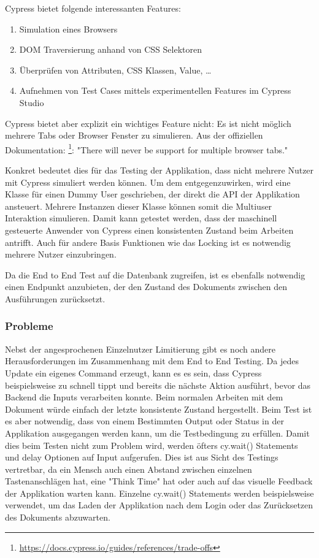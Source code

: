 Cypress bietet folgende interessanten Features:

\begin{enumerate}
    \item Simulation eines Browsers
    \item DOM Traversierung anhand von CSS Selektoren
    \item \"Uberpr\"ufen von Attributen, CSS Klassen, Value, \ldots
    \item Aufnehmen von Test Cases mittels experimentellen Features im Cypress Studio
\end{enumerate}

Cypress bietet aber explizit ein wichtiges Feature nicht: Es ist nicht m\"oglich mehrere Tabs oder Browser Fenster zu simulieren.
Aus der offiziellen Dokumentation: \footnote{\href{https://docs.cypress.io/guides/references/trade-offs}{https://docs.cypress.io/guides/references/trade-offs}}: "There will never be support for multiple browser tabs."

Konkret bedeutet dies f\"ur das Testing der Applikation, dass nicht mehrere Nutzer mit Cypress simuliert werden k\"onnen.
Um dem entgegenzuwirken, wird eine Klasse f\"ur einen Dummy User geschrieben, der direkt die API der Applikation ansteuert.
Mehrere Instanzen dieser Klasse k\"onnen somit die Multiuser Interaktion simulieren.
Damit kann getestet werden, dass der maschinell gesteuerte Anwender von Cypress einen konsistenten Zustand beim Arbeiten antrifft.
Auch f\"ur andere Basis Funktionen wie das Locking ist es notwendig mehrere Nutzer einzubringen.

Da die End to End Test auf die Datenbank zugreifen, ist es ebenfalls notwendig einen Endpunkt anzubieten, der den Zustand des Dokuments zwischen den Ausf\"uhrungen zur\"ucksetzt.

\subsubsection{Probleme}
Nebst der angesprochenen Einzelnutzer Limitierung gibt es noch andere Herausforderungen im Zusammenhang mit dem End to End Testing.
Da jedes Update ein eigenes Command erzeugt, kann es es sein, dass Cypress beispielsweise zu schnell tippt und bereits die n\"achste Aktion ausf\"uhrt, bevor das Backend die Inputs verarbeiten konnte.
Beim normalen Arbeiten mit dem Dokument w\"urde einfach der letzte konsistente Zustand hergestellt.
Beim Test ist es aber notwendig, dass von einem Bestimmten Output oder Status in der Applikation ausgegangen werden kann, um die Testbedingung zu erf\"ullen.
Damit dies beim Testen nicht zum Problem wird, werden \"ofters cy.wait() Statements und delay Optionen auf Input aufgerufen.
Dies ist aus Sicht des Testings vertretbar, da ein Mensch auch einen Abstand zwischen einzelnen Tastenanschl\"agen hat, eine "Think Time" hat oder auch auf das visuelle Feedback der Applikation warten kann.
Einzelne cy.wait() Statements werden beispielsweise verwendet, um das Laden der Applikation nach dem Login oder das Zur\"ucksetzen des Dokuments abzuwarten.

